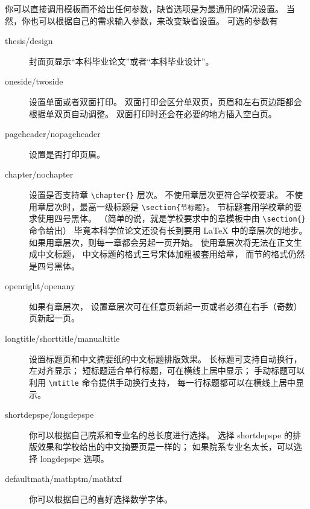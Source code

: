 你可以直接调用模板而不给出任何参数，缺省选项是为最通用的情况设置。
当然，你也可以根据自己的需求输入参数，来改变缺省设置。
可选的参数有
\begin{description}
  \item[thesis/design] 封面页显示“本科毕业论文”或者“本科毕业设计”。
  \item[oneside/twoside] 设置单面或者双面打印。
    双面打印会区分单双页，页眉和左右页边距都会根据单双页自动调整。
    双面打印时还会在必要的地方插入空白页。
  \item[pageheader/nopageheader] 设置是否打印页眉。
  \item[chapter/nochapter] 设置是否支持章 \verb|\chapter{}| 层次。
    不使用章层次更符合学校要求。
    不使用章层次时，最高一级标题是 \verb|\section{节标题}|。
    节标题套用学校章的要求使用四号黑体。
    （简单的说，就是学校要求中的章模板中由 \verb|\section{}| 命令给出）
    毕竟本科学位论文还没有长到要用 \LaTeX{} 中的章层次的地步。
    如果用章层次，则每一章都会另起一页开始。
    使用章层次将无法在正文生成中文标题，
    中文标题的格式三号宋体加粗被套用给章，
    而节的格式仍然是四号黑体。
  \item[openright/openany] 如果有章层次，
    设置章层次可在任意页新起一页或者必须在右手（奇数）页新起一页。
  \item[longtitle/shorttitle/manualtitle]
    设置标题页和中文摘要纸的中文标题排版效果。
    长标题可支持自动换行，左对齐显示；
    短标题适合单行标题，可在横线上居中显示；
    手动标题可以利用 \verb|\mtitle| 命令提供手动换行支持，
    每一行标题都可以在横线上居中显示。
  \item[shortdepspe/longdepspe] 
    你可以根据自己院系和专业名的总长度进行选择。
    选择 shortdepspe 的排版效果和学校给出的中文摘要页是一样的；
    如果院系专业名太长，可以选择 longdepspe 选项。
  \item[defaultmath/mathptm/mathtxf] 你可以根据自己的喜好选择数学字体。
\end{description}
